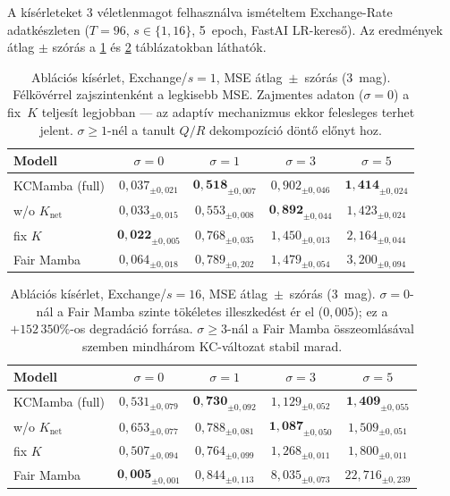 A kísérleteket 3 véletlenmagot felhasználva ismételtem Exchange-Rate
adatkészleten ($T{=}96$, $s \in \{1,16\}$, 5~epoch, FastAI LR-kereső).
Az eredmények átlag $\pm$ szórás a \ref{tab:ablation_s1} és
\ref{tab:ablation_s16} táblázatokban láthatók.

\begin{table}[H]
  \centering
  \small
  \begin{tabular}{|l|c|c|c|c|}
    \hline
    \textbf{Modell} & $\sigma{=}0$ & $\sigma{=}1$ & $\sigma{=}3$ & $\sigma{=}5$ \\
    \hline\hline
    KCMamba (full)     & $0{,}037_{\pm0{,}021}$ & $\mathbf{0{,}518}_{\pm0{,}007}$ & $0{,}902_{\pm0{,}046}$ & $\mathbf{1{,}414}_{\pm0{,}024}$ \\
    w/o $K_\text{net}$ & $0{,}033_{\pm0{,}015}$ & $0{,}553_{\pm0{,}008}$ & $\mathbf{0{,}892}_{\pm0{,}044}$ & $1{,}423_{\pm0{,}024}$ \\
    fix $K$            & $\mathbf{0{,}022}_{\pm0{,}005}$ & $0{,}768_{\pm0{,}035}$ & $1{,}450_{\pm0{,}013}$ & $2{,}164_{\pm0{,}044}$ \\
    Fair Mamba         & $0{,}064_{\pm0{,}018}$ & $0{,}789_{\pm0{,}202}$ & $1{,}479_{\pm0{,}054}$ & $3{,}200_{\pm0{,}094}$ \\
    \hline
  \end{tabular}
  \caption{Ablációs kísérlet, Exchange/$s{=}1$, MSE átlag~$\pm$~szórás (3~mag).
           Félkövérrel zajszintenként a legkisebb MSE.
           Zajmentes adaton ($\sigma{=}0$) a fix~$K$ teljesít legjobban ---
           az adaptív mechanizmus ekkor felesleges terhet jelent.
           $\sigma{\geq}1$-nél a tanult $Q/R$ dekompozíció döntő előnyt hoz.}
  \label{tab:ablation_s1}
\end{table}

\begin{table}[H]
  \centering
  \small
  \begin{tabular}{|l|c|c|c|c|}
    \hline
    \textbf{Modell} & $\sigma{=}0$ & $\sigma{=}1$ & $\sigma{=}3$ & $\sigma{=}5$ \\
    \hline\hline
    KCMamba (full)     & $0{,}531_{\pm0{,}079}$ & $\mathbf{0{,}730}_{\pm0{,}092}$ & $1{,}129_{\pm0{,}052}$ & $\mathbf{1{,}409}_{\pm0{,}055}$ \\
    w/o $K_\text{net}$ & $0{,}653_{\pm0{,}077}$ & $0{,}788_{\pm0{,}081}$ & $\mathbf{1{,}087}_{\pm0{,}050}$ & $1{,}509_{\pm0{,}051}$ \\
    fix $K$            & $0{,}507_{\pm0{,}094}$ & $0{,}764_{\pm0{,}099}$ & $1{,}268_{\pm0{,}011}$ & $1{,}800_{\pm0{,}011}$ \\
    Fair Mamba         & $\mathbf{0{,}005}_{\pm0{,}001}$ & $0{,}844_{\pm0{,}113}$ & $8{,}035_{\pm0{,}073}$ & $22{,}716_{\pm0{,}239}$ \\
    \hline
  \end{tabular}
  \caption{Ablációs kísérlet, Exchange/$s{=}16$, MSE átlag~$\pm$~szórás (3~mag).
           $\sigma{=}0$-nál a Fair Mamba szinte tökéletes illeszkedést ér el
           ($0{,}005$); ez a $+152\,350\%$-os degradáció forrása.
           $\sigma{\geq}3$-nál a Fair Mamba összeomlásával szemben mindhárom
           KC-változat stabil marad.}
  \label{tab:ablation_s16}
\end{table}

